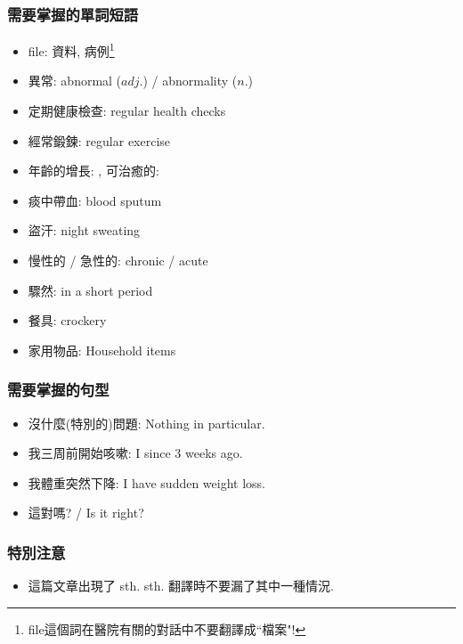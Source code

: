 \subsubsection*{需要掌握的單詞短語}
\begin{multicols}{2}
\begin{itemize}
  \itemsep0em
  \item file: 資料, 病例\footnote{file這個詞在醫院有關的對話中不要翻譯成``檔案"!}
  \item 異常: abnormal ($adj.$) / abnormality ($n.$)
  \item 定期健康檢查: regular health checks
  \item 經常鍛鍊: regular exercise 
  \item 年齡的增長: , 可治癒的: 
  \item 痰中帶血: blood  sputum
  \item 盜汗: night sweating
  \item 慢性的 / 急性的: chronic / acute
  \item 驟然: in a short period
  \item 餐具: crockery
  \item 家用物品: Household items
\end{itemize}
\end{multicols}

\subsubsection*{需要掌握的句型}
\begin{itemize}
  \itemsep0em
  \item 沒什麼(特別的)問題: Nothing in particular.
  \item 我三周前開始咳嗽: I  since 3 weeks ago.
  \item 我體重突然下降: I have sudden weight loss.
  \item 這對嗎?  / Is it right?
\end{itemize}

\subsubsection*{特別注意}
\begin{itemize}
  \itemsep0em
  \item 這篇文章出現了 sth.  sth. 翻譯時不要漏了其中一種情況. 
\end{itemize}

